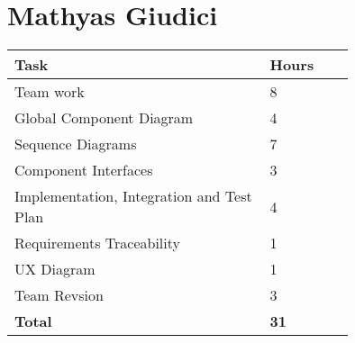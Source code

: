 \section{Mathyas Giudici}

\smallskip
\begin{center}
\begin{tabular}{ | p{0.75\linewidth} | l | }
  \hline
    \textbf{Task} & \textbf{Hours }\\ \hline
    Team work & 8 \\ \hline
    Global Component Diagram & 4 \\ \hline
    Sequence Diagrams & 7 \\ \hline
    Component Interfaces & 3 \\ \hline
    Implementation, Integration and Test Plan & 4 \\ \hline
    Requirements Traceability & 1 \\ \hline
    UX Diagram & 1 \\ \hline
    Team Revsion & 3 \\ \hline
   \textbf{Total} & \textbf{31} \\ \hline
\end{tabular}
\end{center}

\clearpage
